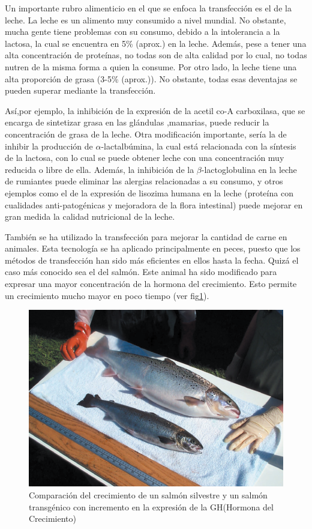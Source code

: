 \documentclass[fleqn,10pt]{SelfArx} %
\begin{document}
Un importante rubro alimenticio en el que se enfoca la transfección es el de la leche. La leche es un alimento muy consumido a nivel mundial. No obstante, mucha gente tiene problemas con su consumo, debido a la intolerancia a la lactosa, la cual se encuentra en 5\% (aprox.) en la leche. Además, pese a tener una alta concentración de proteínas, no todas son de alta calidad por lo cual, no todas nutren de la misma forma a quien la consume. Por otro lado, la leche tiene una alta proporción de grasa (3-5\% (aprox.)). No obstante, todas esas deventajas se pueden superar mediante la transfección\cite{yom1993genetic}. 

Así,por ejemplo, la inhibición de la expresión de la acetil co-A carboxilasa, que se encarga de sintetizar grasa en las glándulas ,mamarias, puede reducir la concentración de grasa de la leche. Otra modificación importante, sería la de inhibir la producción de $\alpha$-lactalbúmina, la cual está relacionada con la síntesis de la lactosa, con lo cual se puede obtener leche con una concentración muy reducida o libre de ella. Además, la inhibición de la $\beta$-lactoglobulina en la leche de rumiantes puede eliminar las alergias relacionadas a su consumo, y otros ejemplos como el de la expresión de lisozima humana en la leche (proteína con cualidades anti-patogénicas y mejoradora de la flora intestinal) puede mejorar en gran medida la calidad nutricional de la leche\cite{yom1993genetic, pintado1998transgenesis, maga2006consumption}.

También se ha utilizado la transfección para mejorar la cantidad de carne en animales. Esta tecnología se ha aplicado principalmente en peces, puesto que los métodos de transfección han sido más eficientes en ellos hasta la fecha. Quizá el caso más conocido sea el del salmón. Este animal ha sido modificado para expresar una mayor concentración de la hormona del crecimiento. Esto permite un crecimiento mucho mayor en poco tiempo (ver fig\ref{salmon})\cite{berkowitz1994transgenic, ledford2013transgenic}.

\begin{figure}[ht]\centering
\includegraphics[width=\linewidth]{images/salmon}
\caption{Comparación del crecimiento de un salmón silvestre y un salmón transgénico con incremento en la expresión de la GH(Hormona del Crecimiento)\cite{berkowitz1994transgenic, ledford2013transgenic}}
\label{salmon}
\end{figure}
\end{document}
